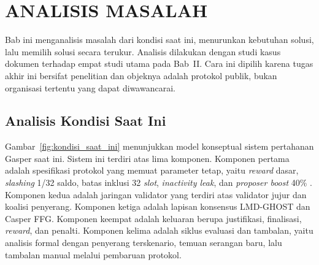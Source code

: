 \cleardoublepage %
\chapter{ANALISIS MASALAH}
\label{chap:analisis-masalah}

Bab ini menganalisis masalah dari kondisi saat ini, menurunkan kebutuhan solusi, lalu memilih solusi secara terukur. Analisis dilakukan dengan studi kasus dokumen terhadap empat studi utama pada Bab~II. Cara ini dipilih karena tugas akhir ini bersifat penelitian dan objeknya adalah protokol publik, bukan organisasi tertentu yang dapat diwawancarai.

\section{Analisis Kondisi Saat Ini}
\label{sec:kondisi_saat_ini}
Gambar~\ref{fig:kondisi_saat_ini} menunjukkan model konseptual sistem pertahanan Gasper saat ini. Sistem ini terdiri atas lima komponen. Komponen pertama adalah spesifikasi protokol yang memuat parameter tetap, yaitu \textit{reward} dasar, \textit{slashing} 1/32 saldo, batas inklusi 32 \textit{slot}, \textit{inactivity leak}, dan \textit{proposer boost} 40\% \parencite{laneve2025stochastic}. Komponen kedua adalah jaringan validator yang terdiri atas validator jujur dan koalisi penyerang. Komponen ketiga adalah lapisan konsensus LMD-GHOST dan Casper FFG. Komponen keempat adalah keluaran berupa justifikasi, finalisasi, \textit{reward}, dan penalti. Komponen kelima adalah siklus evaluasi dan tambalan, yaitu analisis formal dengan penyerang terskenario, temuan serangan baru, lalu tambalan manual melalui pembaruan protokol.

